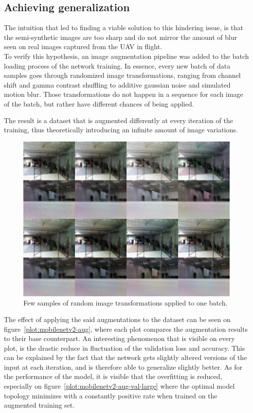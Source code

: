 \subsection{Achieving generalization}

The intuition that led to finding a viable solution to this hindering issue, is
that the semi-synthetic images are too sharp and do not mirror the amount of
blur seen on real images captured from the UAV in flight.\\

To verify this hypothesis, an image augmentation pipeline was added to the
batch loading process of the network training. In essence, every new batch of
data samples goes through randomized image transformations, ranging from
channel shift and gamma contrast shuffling to additive gaussian noise and
simulated motion blur. Those transformations do not happen in a sequence for
each image of the batch, but rather have different chances of being applied.

The result is a dataset that is augmented differently at every iteration of the
training, thus theoretically introducing an infinite amount of image
variations.

\begin{figure}[h]
	\centering
	\includegraphics[width=\textwidth]{figure/augmentation.jpg}
	\caption{Few samples of random image transformations applied to one batch.}
	\label{fig:augmentation}
\end{figure}

The effect of applying the said augmentations to the dataset can be seen on
figure~\ref{plot:mobilenetv2-aug}, where each plot compares the augmentation
results to their base counterpart. An interesting phenomenon that is visible on
every plot, is the drastic reduce in fluctuation of the validation loss and
accuracy. This can be explained by the fact that the network gets slightly
altered versions of the input at each iteration, and is therefore able to
generalize slightly better. As for the performance of the model, it is visible
that the overfitting is reduced, especially on
figure~\ref{plot:mobilenetv2-aug-val-large} where the optimal model topology
minimizes with a constantly positive rate when trained on the augmented
training set.\\

